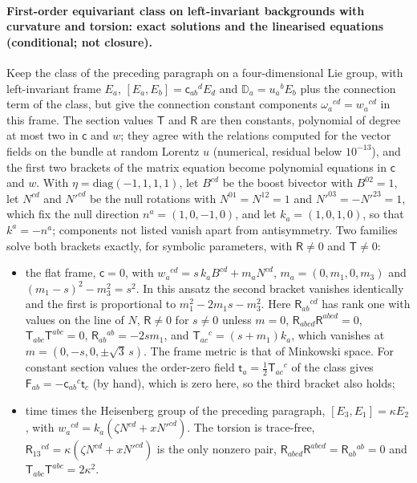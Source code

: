 \paragraph{First-order equivariant class on left-invariant backgrounds with curvature and torsion: exact solutions and the linearised equations (conditional; not closure).}
Keep the class of the preceding paragraph on a four-dimensional Lie group, with left-invariant frame \(E_a\), \([E_a,E_b]=\mathsf c_{ab}{}^dE_d\) and \(\mathbb D_a=u_a{}^bE_b\) plus the connection term of the class, but give the connection constant components \(\omega_a{}^{cd}=w_a{}^{cd}\) in this frame. The section values \(\mathsf T\) and \(\mathsf R\) are then constants, polynomial of degree at most two in \(\mathsf c\) and \(w\); they agree with the relations computed for the vector fields on the bundle at random Lorentz \(u\) (numerical, residual below \(10^{-13}\)), and the first two brackets of the matrix equation become polynomial equations in \(\mathsf c\) and \(w\). With \(\eta=\mathrm{diag}(-1,1,1,1)\), let \(B^{cd}\) be the boost bivector with \(B^{02}=1\), let \(N^{cd}\) and \(N'^{cd}\) be the null rotations with \(N^{01}=N^{12}=1\) and \(N'^{03}=-N'^{23}=1\), which fix the null direction \(n^a=(1,0,-1,0)\), and let \(k_a=(1,0,1,0)\), so that \(k^a=-n^a\); components not listed vanish apart from antisymmetry. Two families solve both brackets exactly, for symbolic parameters, with \(\mathsf R\neq0\) and \(\mathsf T\neq0\):
\begin{itemize}
\item[(i)] the flat frame, \(\mathsf c=0\), with \(w_a{}^{cd}=s\,k_aB^{cd}+m_aN^{cd}\), \(m_a=(0,m_1,0,m_3)\) and \((m_1-s)^2-m_3^2=s^2\). In this ansatz the second bracket vanishes identically and the first is proportional to \(m_1^2-2m_1s-m_3^2\). Here \(\mathsf R_{ab}{}^{cd}\) has rank one with values on the line of \(N\), \(\mathsf R\neq0\) for \(s\neq0\) unless \(m=0\), \(\mathsf R_{abcd}\mathsf R^{abcd}=0\), \(\mathsf T_{abc}\mathsf T^{abc}=0\), \(\mathsf R_{ab}{}^{ab}=-2sm_1\), and \(\mathsf T_{ac}{}^c=(s+m_1)k_a\), which vanishes at \(m=(0,-s,0,\pm\sqrt3\,s)\). The frame metric is that of Minkowski space. For constant section values the order-zero field \(\mathsf t_a=\tfrac12\mathsf T_{ac}{}^c\) of the class gives \(\mathsf F_{ab}=-\mathsf c_{ab}{}^c\mathsf t_c\) (by hand), which is zero here, so the third bracket also holds;
\item[(ii)] time times the Heisenberg group of the preceding paragraph, \([E_3,E_1]=\kappa E_2\), with \(w_a{}^{cd}=k_a(\zeta N^{cd}+xN'^{cd})\). The torsion is trace-free, \(\mathsf R_{13}{}^{cd}=\kappa(\zeta N^{cd}+xN'^{cd})\) is the only nonzero pair, \(\mathsf R_{abcd}\mathsf R^{abcd}=\mathsf R_{ab}{}^{ab}=0\) and \(\mathsf T_{abc}\mathsf T^{abc}=2\kappa^2\).
\end{itemize}
